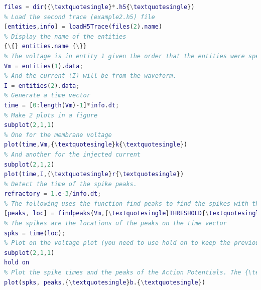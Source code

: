 \begin{lstlisting}[language=matlab,morekeywords={loadH5Trace,ls},escapeinside=\{\}]
% List files that follow the filter *.h5
files = dir({\textquotesingle}*.h5{\textquotesingle})
% Load the second trace (example2.h5) file
[entities,info] = loadH5Trace(files(2).name)
% Display the name of the entities
{\{} entities.name {\}}
% The voltage is in entity 1 given the order that the entities were specified.
Vm = entities(1).data;
% And the current (I) will be from the waveform.
I = entities(2).data;
% Generate a time vector
time = [0:length(Vm)-1]*info.dt;
% Make 2 plots in a figure 
subplot(2,1,1)
% One for the membrane voltage
plot(time,Vm,{\textquotesingle}k{\textquotesingle})
% And another for the injected current
subplot(2,1,2)
plot(time,I,{\textquotesingle}r{\textquotesingle})
% Detect the time of the spike peaks.
refractory = 1.e-3/info.dt; 
% The following uses the function find peaks to find the spikes with threshold crossing at 0mV and a refractory period. 
[peaks, loc] = findpeaks(Vm,{\textquotesingle}THRESHOLD{\textquotesingle},0,{\textquotesingle}MINPEAKDISTANCE{\textquotesingle},refractory);
% The spikes are the locations of the peaks on the time vector
spks = time(loc);
% Plot on the voltage plot (you need to use hold on to keep the previous plot)
subplot(2,1,1)
hold on
% Plot the spike times and the peaks of the Action Potentials. The {\textquotesingle}hold on{\textquotesingle} command makes that the plots overlap.
plot(spks, peaks,{\textquotesingle}b.{\textquotesingle})
\end{lstlisting}
 \fi
 
